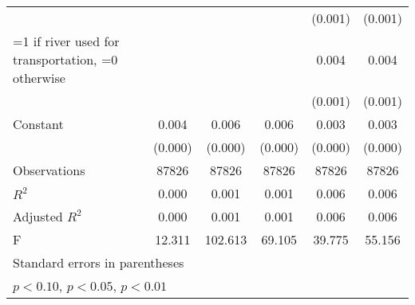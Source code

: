 {\begin{tabular}{l*{5}{c}}
                    &                     &                     &                     &     (0.001)         &     (0.001)         \\
\addlinespace
\hspace{0.25cm} =1 if river used for transportation, =0 otherwise&                     &                     &                     &       0.004\sym{***}&       0.004\sym{***}\\
                    &                     &                     &                     &     (0.001)         &     (0.001)         \\
\addlinespace
Constant            &       0.004\sym{***}&       0.006\sym{***}&       0.006\sym{***}&       0.003\sym{***}&       0.003\sym{***}\\
                    &     (0.000)         &     (0.000)         &     (0.000)         &     (0.000)         &     (0.000)         \\
\midrule
Observations        &       87826         &       87826         &       87826         &       87826         &       87826         \\
\(R^{2}\)           &       0.000         &       0.001         &       0.001         &       0.006         &       0.006         \\
Adjusted \(R^{2}\)  &       0.000         &       0.001         &       0.001         &       0.006         &       0.006         \\
F                   &      12.311         &     102.613         &      69.105         &      39.775         &      55.156         \\
\bottomrule
\multicolumn{6}{l}{\footnotesize Standard errors in parentheses}\\
\multicolumn{6}{l}{\footnotesize \sym{*} \(p<0.10\), \sym{**} \(p<0.05\), \sym{***} \(p<0.01\)}\\
\end{tabular}
}
